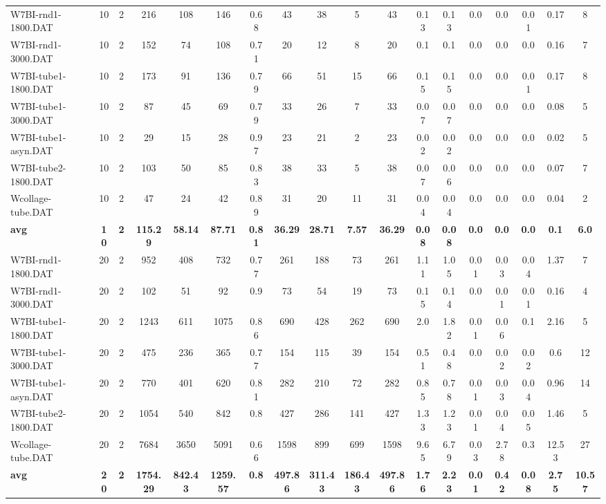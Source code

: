 \begin{sidewaystable}[h]
{\begin{tabular}{lccccccccccccccccc}
W7BI-rnd1-1800.DAT & 10 & 2 & 216 & 108 & 146 & 0.68 & 43 & 38 & 5 & 43 & 0.13 & 0.13 & 0.0 & 0.0 & 0.01 & 0.17 & 8\\
W7BI-rnd1-3000.DAT & 10 & 2 & 152 & 74 & 108 & 0.71 & 20 & 12 & 8 & 20 & 0.1 & 0.1 & 0.0 & 0.0 & 0.0 & 0.16 & 7\\
W7BI-tube1-1800.DAT & 10 & 2 & 173 & 91 & 136 & 0.79 & 66 & 51 & 15 & 66 & 0.15 & 0.15 & 0.0 & 0.0 & 0.01 & 0.17 & 8\\
W7BI-tube1-3000.DAT & 10 & 2 & 87 & 45 & 69 & 0.79 & 33 & 26 & 7 & 33 & 0.07 & 0.07 & 0.0 & 0.0 & 0.0 & 0.08 & 5\\
W7BI-tube1-asyn.DAT & 10 & 2 & 29 & 15 & 28 & 0.97 & 23 & 21 & 2 & 23 & 0.02 & 0.02 & 0.0 & 0.0 & 0.0 & 0.02 & 5\\
W7BI-tube2-1800.DAT & 10 & 2 & 103 & 50 & 85 & 0.83 & 38 & 33 & 5 & 38 & 0.07 & 0.06 & 0.0 & 0.0 & 0.0 & 0.07 & 7\\
Wcollage-tube.DAT & 10 & 2 & 47 & 24 & 42 & 0.89 & 31 & 20 & 11 & 31 & 0.04 & 0.04 & 0.0 & 0.0 & 0.0 & 0.04 & 2\\
\cline{1-18} \textbf{avg} & \textbf{10} & \textbf{2} & \textbf{115.29} & \textbf{58.14} & \textbf{87.71} & \textbf{0.81} & \textbf{36.29} & \textbf{28.71} & \textbf{7.57} & \textbf{36.29} & \textbf{0.08} & \textbf{0.08} & \textbf{0.0} & \textbf{0.0} & \textbf{0.0} & \textbf{0.1} & \textbf{6.0} \\ \cline{1-18}
W7BI-rnd1-1800.DAT & 20 & 2 & 952 & 408 & 732 & 0.77 & 261 & 188 & 73 & 261 & 1.11 & 1.05 & 0.01 & 0.03 & 0.04 & 1.37 & 7\\
W7BI-rnd1-3000.DAT & 20 & 2 & 102 & 51 & 92 & 0.9 & 73 & 54 & 19 & 73 & 0.15 & 0.14 & 0.0 & 0.01 & 0.01 & 0.16 & 4\\
W7BI-tube1-1800.DAT & 20 & 2 & 1243 & 611 & 1075 & 0.86 & 690 & 428 & 262 & 690 & 2.0 & 1.82 & 0.01 & 0.06 & 0.1 & 2.16 & 5\\
W7BI-tube1-3000.DAT & 20 & 2 & 475 & 236 & 365 & 0.77 & 154 & 115 & 39 & 154 & 0.51 & 0.48 & 0.0 & 0.02 & 0.02 & 0.6 & 12\\
W7BI-tube1-asyn.DAT & 20 & 2 & 770 & 401 & 620 & 0.81 & 282 & 210 & 72 & 282 & 0.85 & 0.78 & 0.01 & 0.03 & 0.04 & 0.96 & 14\\
W7BI-tube2-1800.DAT & 20 & 2 & 1054 & 540 & 842 & 0.8 & 427 & 286 & 141 & 427 & 1.33 & 1.23 & 0.01 & 0.04 & 0.05 & 1.46 & 5\\
Wcollage-tube.DAT & 20 & 2 & 7684 & 3650 & 5091 & 0.66 & 1598 & 899 & 699 & 1598 & 9.65 & 6.79 & 0.03 & 2.78 & 0.3 & 12.53 & 27\\
\cline{1-18} \textbf{avg} & \textbf{20} & \textbf{2} & \textbf{1754.29} & \textbf{842.43} & \textbf{1259.57} & \textbf{0.8} & \textbf{497.86} & \textbf{311.43} & \textbf{186.43} & \textbf{497.86} & \textbf{1.76} & \textbf{2.23} & \textbf{0.01} & \textbf{0.42} & \textbf{0.08} & \textbf{2.75} & \textbf{10.57} \\ \cline{1-18}

\end{tabular}}
\end{sidewaystable}
